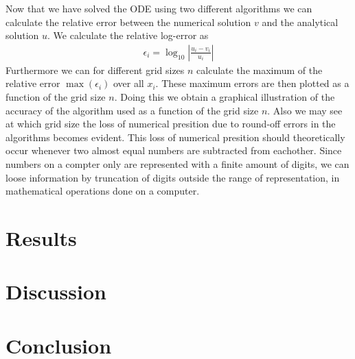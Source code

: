 \documentclass[twocolumn]{aastex62}
\begin{document}
Now that we have solved the ODE using two different algorithms we can calculate the relative error between the numerical solution $v$ and the analytical solution $u$. We calculate the relative log-error as 
\begin{align}
	\epsilon_i = \log_{10} \left|\frac{u_i - v_i}{u_i}\right|
\end{align}
Furthermore we can for different grid sizes $n$ calculate the maximum of the relative error $\max(\epsilon_i)$ over all $x_i$. These maximum errors are then plotted as a function of the grid size $n$. Doing this we obtain a graphical illustration of the accuracy of the algorithm used as a function of the grid size $n$. Also we may see at which grid size the loss of numerical presition due to round-off errors in the algorithms becomes evident. This loss of numerical presition should theoretically occur whenever two almost equal numbers are subtracted from eachother. Since numbers on a compter only are represented with a finite amount of digits, we can loose information by truncation of digits outside the range of representation, in mathematical operations done on a computer.

\section{Results} \label{sec:results}

\section{Discussion} \label{sec:discussion}

\section{Conclusion} \label{sec:conclusion}

\
\end{document}
